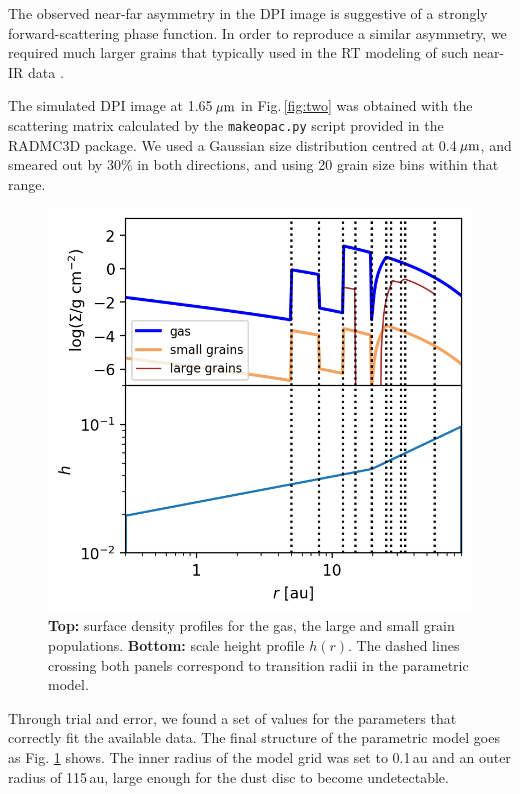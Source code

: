 \documentclass[letters,usenatbib,times]{mnras}
\begin{document}
The observed near-far asymmetry in the DPI image is suggestive of a strongly forward-scattering phase function. In order to reproduce a similar  asymmetry, we required much larger grains that typically used in the RT modeling of  such near-IR data \citep[e.g.][]{2018MNRAS.477.5104C}. 


The simulated DPI image at 1.65\,$\hbox{$\mu$m}$ in Fig.\,\ref{fig:two} was obtained with the scattering matrix calculated by the {\tt makeopac.py} script provided in the RADMC3D package. We used a  Gaussian size distribution centred at 0.4\,$\hbox{$\mu$m}$, and smeared  out by 30\% in both directions, and using 20 grain size bins within  that range. 

\begin{figure}
	\includegraphics[width=\columnwidth]{allprofiles.png}
        \caption{{\bf Top:}  surface density profiles for the gas, the large and small grain populations. {\bf Bottom:}  scale height profile $h(r)$. The dashed lines crossing both panels correspond to transition  radii in the parametric model.}
    \label{fig:profiles}
\end{figure}

Through trial and error, we found a set of values for the parameters that  correctly fit the available data. The final structure of the parametric model goes as Fig. \ref{fig:profiles} shows. The inner radius of the model grid was set to 0.1\,au and an outer radius of 115\,au, large enough for the dust disc to become undetectable.
\end{document}
